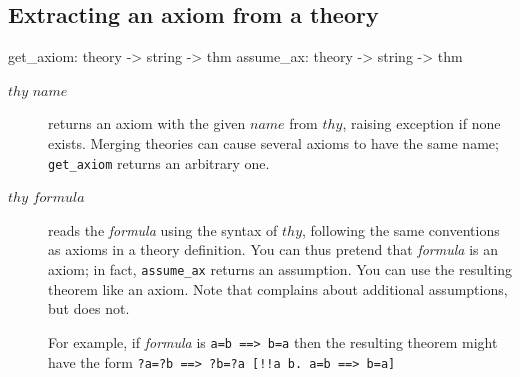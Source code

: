 \subsection{Extracting an axiom from a theory}
\begin{ttbox} 
get_axiom: theory -> string -> thm
assume_ax: theory -> string -> thm
\end{ttbox}
\begin{description}
\item[ $thy$ $name$] 
returns an axiom with the given $name$ from $thy$, raising exception
 if none exists.  Merging theories can cause several axioms
to have the same name; {\tt get_axiom} returns an arbitrary one.

\item[ $thy$ $formula$] 
reads the {\it formula} using the syntax of $thy$, following the same
conventions as axioms in a theory definition.  You can thus pretend that
{\it formula} is an axiom; in fact, {\tt assume_ax} returns an assumption.
You can use the resulting theorem like an axiom.  Note that 
 complains about additional assumptions, but 
 does not.

For example, if {\it formula} is
\hbox{\tt a=b ==> b=a} then the resulting theorem might have the form
\hbox{\tt\frenchspacing ?a=?b ==> ?b=?a  [!!a b. a=b ==> b=a]}
\end{description}

